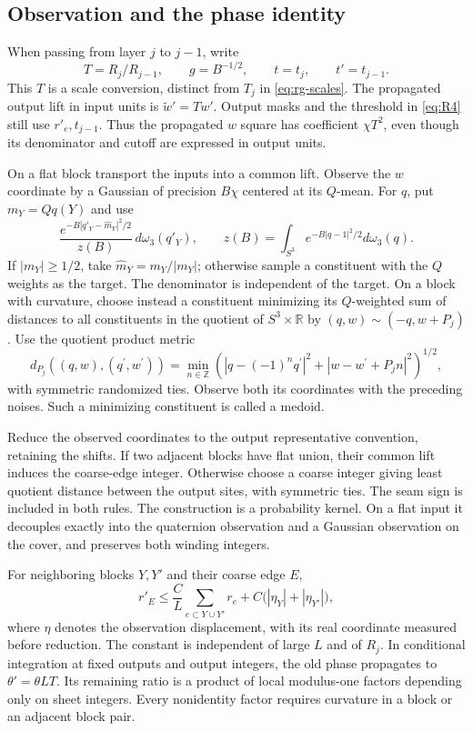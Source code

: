 \subsection{Observation and the phase identity}

When passing from layer $j$ to $j-1$, write
\[
              T=R_j/R_{j-1},\qquad g=B^{-1/2},\qquad
              t=t_j,\qquad t'=t_{j-1}.
\]
This $T$ is a scale conversion, distinct from $T_j$ in
\eqref{eq:rg-scales}.  The propagated output lift in input units is
$\widetilde w'=Tw'$.  Output masks and the threshold in
\eqref{eq:R4} still use $r'_e,t_{j-1}$.  Thus the propagated $w$ square
has coefficient $\chi T^2$, even though its denominator and cutoff are
expressed in output units.

On a flat block transport the inputs into a common lift.  Observe the
$w$ coordinate by a Gaussian of precision $B\chi$ centered at its
$Q$-mean.  For $q$, put $m_Y=Qq(Y)$ and use
\[
 \frac{e^{-B|q'_Y-\widehat m_Y|^2/2}}{z(B)}\,d\omega_3(q'_Y),\qquad
 z(B)=\int_{S^3}e^{-B|q-1|^2/2}d\omega_3(q).
\]
If $|m_Y|\ge1/2$, take $\widehat m_Y=m_Y/|m_Y|$; otherwise sample a
constituent with the $Q$ weights as the target.  The denominator is
independent of the target.  On a block with curvature, choose instead
a constituent minimizing its $Q$-weighted sum of distances to all
constituents in the quotient of $S^3\times\mathbb R$ by
$(q,w)\sim(-q,w+P_j)$.  Use the quotient product metric
\[
 d_{P_j}((q,w),(q^{\prime},w^{\prime}))
 =\min_{n\in\mathbb Z}\left(
 |q-(-1)^nq^{\prime}|^2+|w-w^{\prime}+P_jn|^2\right)^{1/2},
\]
with symmetric randomized ties.  Observe
both its coordinates with the preceding noises.  Such a minimizing
constituent is called a medoid.

Reduce the observed coordinates to the output representative convention,
retaining the shifts.  If two adjacent blocks have flat union, their
common lift induces the coarse-edge integer.  Otherwise choose a coarse
integer giving least quotient distance between the output sites, with
symmetric ties.  The seam sign is included in both rules.  The
construction is a probability kernel.  On a flat input it decouples
exactly into the quaternion observation and a Gaussian observation on
the cover, and preserves both winding integers.

\begin{lemma}
\label{lem:rg-observation}
For neighboring blocks $Y,Y'$ and their coarse edge $E$,
\begin{equation}
 r'_E\le\frac C L\sum_{e\subset Y\cup Y'}r_e
       +C\bigl(|\eta_Y|+|\eta_{Y'}|\bigr),
 \label{eq:R8}
\end{equation}
where $\eta$ denotes the observation displacement, with its real
coordinate measured before reduction.  The constant is independent of
large $L$ and of $R_j$.  In conditional integration at fixed outputs
and output integers, the old phase propagates to
$\theta'=\theta LT$.  Its remaining ratio is a product of local
modulus-one factors depending only on sheet integers.  Every nonidentity
factor requires curvature in a block or an adjacent block pair.
\end{lemma}

